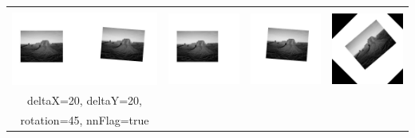 \documentclass[12pt,german]{article}
\begin{document}
\begin{table}[H]
\begin{tabular}{| c | c | c | c |}
    
    \hline
     & & & \\
    \includegraphics[width=5cm]{images/register/gray1.jpg}  &
    \includegraphics[width=2.5cm]{images/register/first-half-image-01.jpg} &
    \includegraphics[width=2.5cm]{images/register/second-half-image-01.jpg} &
    \includegraphics[width=2.5cm]{images/register/transformed-image-03.jpg} \\
	deltaX=20, deltaY=20,  & & & \\
	rotation=45, nnFlag=true & & & \\
    

\end{tabular}
\end{table}
\end{document}
